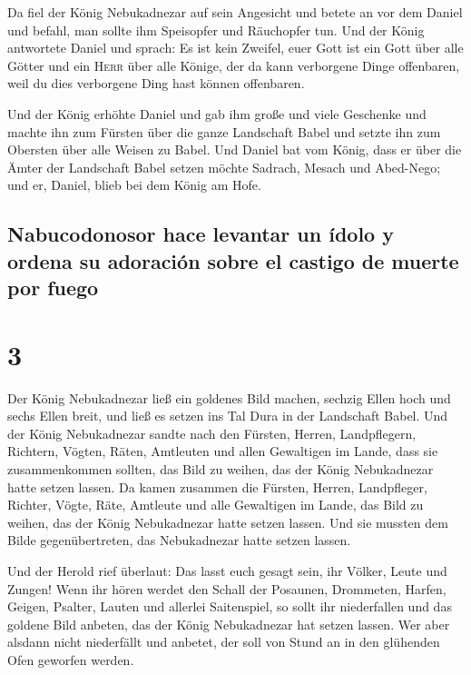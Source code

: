  Da fiel der König Nebukadnezar auf sein Angesicht und
betete an vor dem Daniel und befahl, man sollte ihm Speisopfer und
Räuchopfer tun.  Und der König antwortete Daniel und
sprach: Es ist kein Zweifel, euer Gott ist ein Gott über alle Götter und
ein \textsc{Herr} über alle Könige, der da kann verborgene Dinge
offenbaren, weil du dies verborgene Ding hast können offenbaren.

 Und der König erhöhte Daniel und gab ihm große und viele
Geschenke und machte ihn zum Fürsten über die ganze Landschaft Babel und
setzte ihn zum Obersten über alle Weisen zu Babel.  Und
Daniel bat vom König, dass er über die Ämter der Landschaft Babel setzen
möchte Sadrach, Mesach und Abed-Nego; und er, Daniel, blieb bei dem
König am Hofe.

\hypertarget{nabucodonosor-hace-levantar-un-uxeddolo-y-ordena-su-adoraciuxf3n-sobre-el-castigo-de-muerte-por-fuego}{%
\subsection{Nabucodonosor hace levantar un ídolo y ordena su adoración
sobre el castigo de muerte por
fuego}\label{nabucodonosor-hace-levantar-un-uxeddolo-y-ordena-su-adoraciuxf3n-sobre-el-castigo-de-muerte-por-fuego}}

\hypertarget{section-2}{%
\section{3}\label{section-2}}

 Der König Nebukadnezar ließ ein goldenes Bild machen,
sechzig Ellen hoch und sechs Ellen breit, und ließ es setzen ins Tal
Dura in der Landschaft Babel.  Und der König Nebukadnezar
sandte nach den Fürsten, Herren, Landpflegern, Richtern, Vögten, Räten,
Amtleuten und allen Gewaltigen im Lande, dass sie zusammenkommen
sollten, das Bild zu weihen, das der König Nebukadnezar hatte setzen
lassen.  Da kamen zusammen die Fürsten, Herren,
Landpfleger, Richter, Vögte, Räte, Amtleute und alle Gewaltigen im
Lande, das Bild zu weihen, das der König Nebukadnezar hatte setzen
lassen. Und sie mussten dem Bilde gegenübertreten, das Nebukadnezar
hatte setzen lassen.

 Und der Herold rief überlaut: Das lasst euch gesagt sein,
ihr Völker, Leute und Zungen!  Wenn ihr hören werdet den
Schall der Posaunen, Drommeten, Harfen, Geigen, Psalter, Lauten und
allerlei Saitenspiel, so sollt ihr niederfallen und das goldene Bild
anbeten, das der König Nebukadnezar hat setzen lassen. 
Wer aber alsdann nicht niederfällt und anbetet, der soll von Stund an in
den glühenden Ofen geworfen werden.

